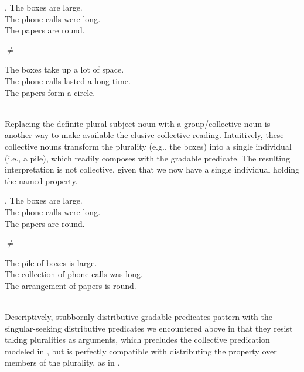 \documentclass[linguex]{sp}
\begin{document}
\begin{minipage}{.405\textwidth}
	\ex.
	The boxes are large.\\
	The phone calls were long.\\
	The papers are round.
	
\end{minipage}
\begin{minipage}{.05\textwidth}
	$\neq$
\end{minipage}
\begin{minipage}{.5\textwidth}
	The boxes take up a lot of space.\\
	The phone calls lasted a long time.\\
	The papers form a circle.
\end{minipage}\\[5pt]

Replacing the definite plural subject noun with a group/collective noun \citep[i.e., an atomizer;][]{scontras2014diss} is another way to make available the elusive collective reading. Intuitively, these collective nouns transform the plurality (e.g., the boxes) into a single individual (i.e., a pile), which readily composes with the gradable predicate. The resulting interpretation is not collective, given that we now have a single individual holding the named property.\\

\begin{minipage}{.405\textwidth}
	\ex.
	The boxes are large.\\
	The phone calls were long.\\
	The papers are round.
	
\end{minipage}
\begin{minipage}{.05\textwidth}
	$\neq$
\end{minipage}
\begin{minipage}{.5\textwidth}
	The pile of boxes is large.\\
	The collection of phone calls was long.\\
	The arrangement of papers is round.
\end{minipage}\\[5pt]

Descriptively, stubbornly distributive gradable predicates pattern with the singular-seeking distributive predicates we encountered above in that they resist taking pluralities as arguments, which precludes the collective predication modeled in \Next[a], but is perfectly compatible with distributing the property over members of the plurality, as in \Next[b].
\end{document}
